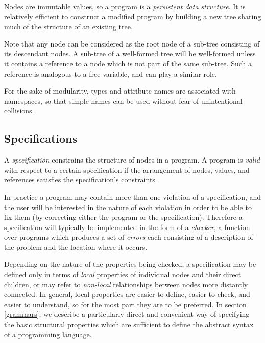 Nodes are immutable values, so a program is a \emph{persistent data structure}\cite{sarnak}. It is relatively efficient to construct a modified program by building a new tree sharing much of the structure of an existing tree.

Note that any node can be considered as the root node of a sub-tree consisting of its descendant nodes. A sub-tree of a well-formed tree will be well-formed unless it contains a  reference to a node which is not part of the same sub-tree. Such a reference is analogous to a free variable, and can play a similar role.

For the sake of modularity, types and attribute names are associated with namespaces, so that simple names can be used without fear of unintentional collisions. 


\subsection{Specifications}
A \emph{specification} constrains the structure of nodes in a program. A program is \emph{valid} with respect to a certain specification if the arrangement of nodes, values, and references satisfies the specification's constraints.


In practice a program may contain more than one violation of a specification, and the user will be interested in the nature of each violation in order to be able to fix them (by correcting either the program or the specification). Therefore a specification will typically be implemented in the form of a \emph{checker}, a function over programs which produces a set of \emph{errors} each consisting of a description of the problem and the location where it occurs.

Depending on the nature of the properties being checked, a specification may be defined only in terms of \emph{local} properties of individual nodes and their direct children, or may refer to \emph{non-local} relationships between nodes more distantly connected. In general, local properties are easier to define, easier to check, and easier to understand, so for the most part they are to be preferred. In section \ref{grammars}, we describe a particularly direct and convenient way of specifying the basic structural properties which are sufficient to define the abstract syntax of a programming language.

